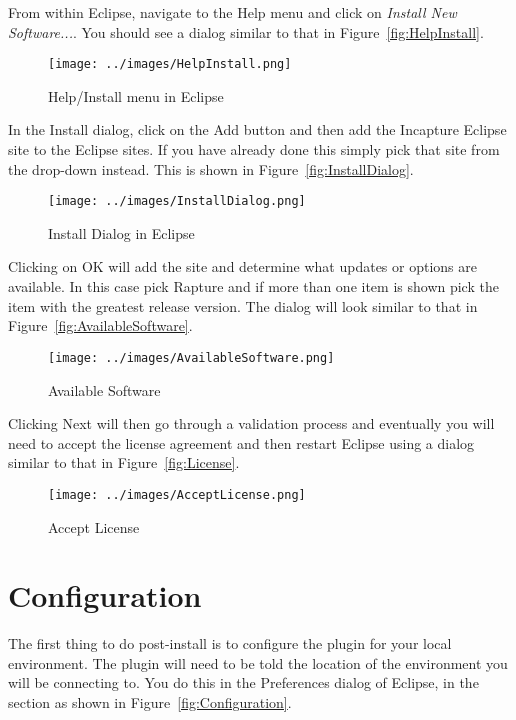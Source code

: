 From within Eclipse, navigate to the Help menu and click on \emph{Install New Software...}. You should see a dialog similar to that in Figure~\vref{fig:HelpInstall}.

\begin{figure}[htb]
\centering
\texttt{[image: ../images/HelpInstall.png]}
\caption{Help/Install menu in Eclipse}
\label{fig:HelpInstall}
\end{figure}

In the Install dialog, click on the Add button and then add the Incapture \Rapture Eclipse site to the Eclipse sites. If you have already done this simply pick that site from the drop-down instead. This is shown in Figure~\vref{fig:InstallDialog}.

\begin{figure}[htb]
\centering
\texttt{[image: ../images/InstallDialog.png]}
\caption{Install Dialog in Eclipse}
\label{fig:InstallDialog}
\end{figure}

Clicking on OK will add the site and determine what updates or options are available. In this case pick Rapture and if more than one item is shown pick the item with the greatest release version. The dialog will look similar to that in Figure~\vref{fig:AvailableSoftware}.

\begin{figure}[htb]
\centering
\texttt{[image: ../images/AvailableSoftware.png]}
\caption{Available Software}
\label{fig:AvailableSoftware}
\end{figure}

Clicking Next will then go through a validation process and eventually you will need to accept the license agreement and then restart Eclipse using a dialog similar to that in Figure~\vref{fig:License}.

\begin{figure}[htb]
\centering
\texttt{[image: ../images/AcceptLicense.png]}
\caption{Accept License}
\label{fig:License}
\end{figure}

\section{Configuration}

The first thing to do post-install is to configure the \Rapture plugin for your local environment. The plugin will need to be told the location of the \Rapture environment you will be connecting to. You do this in the Preferences dialog of Eclipse, in the \Rapture section as shown in Figure~\vref{fig:Configuration}.

